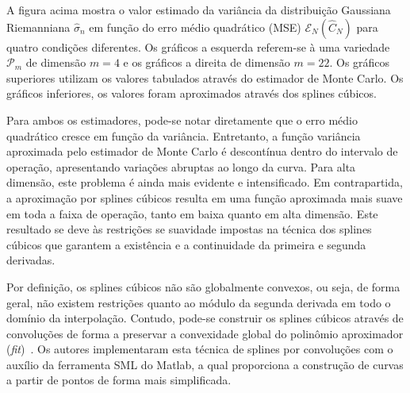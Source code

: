 \documentclass[a4paper,titlepage]{article}
\begin{document}
A figura acima mostra o valor estimado da variância da distribuição Gaussiana
Riemanniana $\hat{\sigma}_n$ em função do erro médio quadrático (MSE)
$\mathcal{E}_N(\hat{C}_N)$ para quatro condições diferentes. Os gráficos a
esquerda referem-se à uma variedade $\mathcal{P}_m$ de dimensão $m=4$ e os
gráficos a direita de dimensão $m=22$. Os gráficos superiores utilizam os
valores tabulados através do estimador de Monte Carlo. Os gráficos inferiores,
os valores foram aproximados através dos splines cúbicos.

Para ambos os estimadores, pode-se notar diretamente que o erro médio
quadrático cresce em função da variância. Entretanto, a função variância
aproximada pelo estimador de Monte Carlo é descontínua dentro do intervalo de
operação, apresentando variações abruptas ao longo da curva. Para alta
dimensão, este problema é ainda mais evidente e intensificado. Em
contrapartida, a aproximação por splines cúbicos resulta em uma função
aproximada mais suave em toda a faixa de operação, tanto em baixa quanto em
alta dimensão. Este resultado se deve às restrições se suavidade impostas na
técnica dos splines cúbicos que garantem a existência e a continuidade da
primeira e segunda derivadas.  

\begin{center}
  \vspace{1em}
  \vspace{1em}
\end{center}

Por definição, os splines cúbicos não são globalmente convexos, ou seja,
de forma geral, não existem restrições quanto ao módulo da segunda derivada
em todo o domínio da interpolação. Contudo, pode-se construir os splines
cúbicos através de convoluções de forma a preservar a convexidade global
do polinômio aproximador (\textit{fit})~\cite{convexsplines}. Os autores
implementaram esta técnica de splines por convoluções com o auxílio da
ferramenta SML do Matlab\cite{d2009slm}, a qual proporciona a construção de
curvas a partir de pontos de forma mais simplificada.
\end{document}
